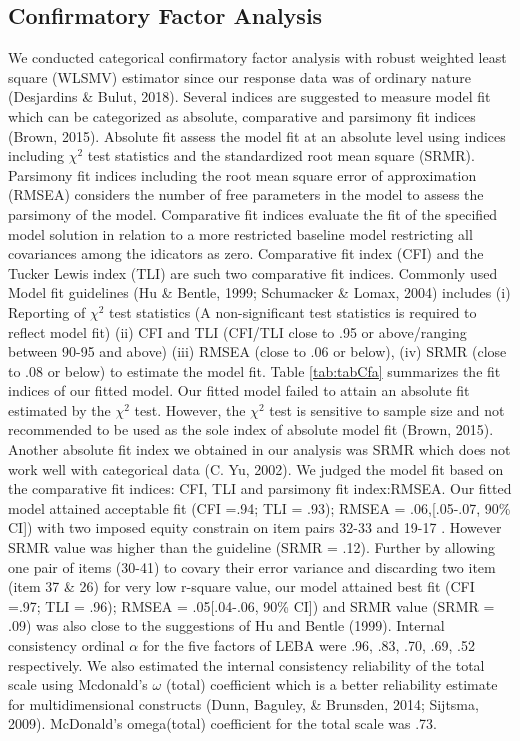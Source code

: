 \documentclass[
  english,
  man]{apa6}
\begin{document}
\hypertarget{confirmatory-factor-analysis}{%
\subsection{Confirmatory Factor Analysis}\label{confirmatory-factor-analysis}}

We conducted categorical confirmatory factor analysis with robust weighted least square (WLSMV) estimator since our response data was of ordinary nature (Desjardins \& Bulut, 2018). Several indices are suggested to measure model fit which can be categorized as absolute, comparative and parsimony fit indices (Brown, 2015). Absolute fit assess the model fit at an absolute level using indices including \(\chi^2\) test statistics and the standardized root mean square (SRMR). Parsimony fit indices including the root mean square error of approximation (RMSEA) considers the number of free parameters in the model to assess the parsimony of the model. Comparative fit indices evaluate the fit of the specified model solution in relation to a more restricted baseline model restricting all covariances among the idicators as zero. Comparative fit index (CFI) and the Tucker Lewis index (TLI) are such two comparative fit indices. Commonly used Model fit guidelines (Hu \& Bentle, 1999; Schumacker \& Lomax, 2004) includes (i) Reporting of \(\chi^2\) test statistics (A non-significant test statistics is required to reflect model fit) (ii) CFI and TLI (CFI/TLI close to .95 or above/ranging between 90-95 and above) (iii) RMSEA (close to .06 or below), (iv) SRMR (close to .08 or below) to estimate the model fit. Table \ref{tab:tabCfa} summarizes the fit indices of our fitted model. Our fitted model failed to attain an absolute fit estimated by the \(\chi^2\) test. However, the \(\chi^2\) test is sensitive to sample size and not recommended to be used as the sole index of absolute model fit (Brown, 2015). Another absolute fit index we obtained in our analysis was SRMR which does not work well with categorical data (C. Yu, 2002). We judged the model fit based on the comparative fit indices: CFI, TLI and parsimony fit index:RMSEA. Our fitted model attained acceptable fit (CFI =.94; TLI = .93); RMSEA = .06,{[}.05-.07, 90\% CI{]}) with two imposed equity constrain on item pairs 32-33 and 19-17 . However SRMR value was higher than the guideline (SRMR = .12). Further by allowing one pair of items (30-41) to covary their error variance and discarding two item (item 37 \& 26) for very low r-square value, our model attained best fit (CFI =.97; TLI = .96); RMSEA = .05{[}.04-.06, 90\% CI{]}) and SRMR value (SRMR = .09) was also close to the suggestions of Hu and Bentle (1999).
Internal consistency ordinal \(\alpha\) for the five factors of LEBA were .96, .83, .70, .69, .52 respectively. We also estimated the internal consistency reliability of the total scale using Mcdonald's \(\omega\) (total) coefficient which is a better reliability estimate for multidimensional constructs (Dunn, Baguley, \& Brunsden, 2014; Sijtsma, 2009). McDonald's omega(total) coefficient for the total scale was .73.
\end{document}
